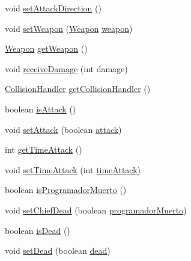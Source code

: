 \begin{DoxyCompactItemize}
\item 
void \mbox{\hyperlink{classentities_1_1_subject_afca29e70bf8dead65f5b7cceec65a513}{set\+Attack\+Direction}} ()
\item 
void \mbox{\hyperlink{classentities_1_1_subject_ad84e9c9719aedcfc3387ddc8b3d1ecd7}{set\+Weapon}} (\mbox{\hyperlink{classitems_1_1weapons_1_1_weapon}{Weapon}} \mbox{\hyperlink{classentities_1_1_subject_abb65e5fdf2a2b62efa2c9b1368c83f15}{weapon}})
\item 
\mbox{\hyperlink{classitems_1_1weapons_1_1_weapon}{Weapon}} \mbox{\hyperlink{classentities_1_1_subject_a83e9ae12f3fc398ba7e9b7381e7b23b2}{get\+Weapon}} ()
\item 
void \mbox{\hyperlink{classentities_1_1_subject_aa9c4ab4fd0312b5626ccf6f6864a1bcd}{receive\+Damage}} (int damage)
\item 
\mbox{\hyperlink{classentities_1_1_collision_handler}{Collision\+Handler}} \mbox{\hyperlink{classentities_1_1_subject_a468ec8565a71cca64835803af89fbc8a}{get\+Collision\+Handler}} ()
\item 
boolean \mbox{\hyperlink{classentities_1_1_subject_a6c4ff8d1e50168c7738c8b39cec72631}{is\+Attack}} ()
\item 
void \mbox{\hyperlink{classentities_1_1_subject_af0888e5d9f89c7afddf8aef0f64ee4e3}{set\+Attack}} (boolean \mbox{\hyperlink{classentities_1_1_subject_a1f8a6d36e95270aee0e8d46e1c6c0712}{attack}})
\item 
int \mbox{\hyperlink{classentities_1_1_subject_aba88edce7404e7379cc8c16566d33f80}{get\+Time\+Attack}} ()
\item 
void \mbox{\hyperlink{classentities_1_1_subject_a315fc3ace9512285792c6865955e0f17}{set\+Time\+Attack}} (int \mbox{\hyperlink{classentities_1_1_subject_a497b24a97e5d4835bd5f8c70584701e2}{time\+Attack}})
\item 
boolean \mbox{\hyperlink{classentities_1_1_subject_a2fa68c05da096ebbd98b65b91d73abc3}{is\+Programador\+Muerto}} ()
\item 
void \mbox{\hyperlink{classentities_1_1_subject_a1f173d38d9133a93636087ff78975e90}{set\+Chief\+Dead}} (boolean \mbox{\hyperlink{classentities_1_1_subject_a79362565afa5f3420bd609feb5074c78}{programador\+Muerto}})
\item 
boolean \mbox{\hyperlink{classentities_1_1_subject_a970082c9d187619c1a27dceec8b3b908}{is\+Dead}} ()
\item 
void \mbox{\hyperlink{classentities_1_1_subject_afcd1592b3482f8ec59d577c99aa8ba25}{set\+Dead}} (boolean \mbox{\hyperlink{classentities_1_1_subject_aab6a2f2446349b10689270b86e7931a4}{dead}})

\end{DoxyCompactItemize}
